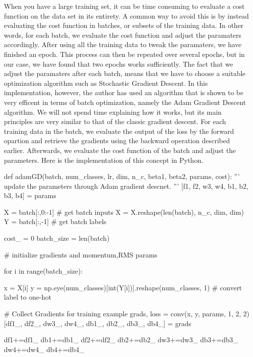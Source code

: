 \startsubsection[title=Batch Optimization]
When you have a large training set, it can be time consuming to evaluate a cost function on the data set in its entirety.
A common way to avoid this is by instead evaluating the cost function in batches, or subsets of the training data.
In other words, for each batch, we evaluate the cost function and adjust the paramaters accordingly. 
After using all the training data to tweak the paramaters, we have finished an epoch.
This process can then be repeated over several epochs, but in our case, we have found that two epochs works sufficiently.
The fact that we adjust the paramaters after each batch, means that we have to choose a suitable optimization algorithm such as Stochastic Gradient Descent.
In this implementation, however, the author has used an algorithm that is shown to be very efficent in terms of batch optimization, namely the Adam Gradient Descent algorithm.
We will not spend time explaining how it works, but its main principles are very similar to that of the classic gradient descent.
For each training data in the batch, we evaluate the output of the loss by the forward opartion and retrieve the gradients using the backward operation described earlier. 
Afterwards, we evaluate the cost function of the batch and adjust the parameters.
Here is the implementation of this concept in Python.

\starttyping
def adamGD(batch, num_classes, lr, dim, n_c, beta1, beta2, params, cost):
    '''
    update the parameters through Adam gradient descnet.
    '''
    [f1, f2, w3, w4, b1, b2, b3, b4] = params
    
    X = batch[:,0:-1] # get batch inputs
    X = X.reshape(len(batch), n_c, dim, dim)
    Y = batch[:,-1] # get batch labels
    
    cost_ = 0
    batch_size = len(batch)
    
    # initialize gradients and momentum,RMS params

    for i in range(batch_size):
        
        x = X[i]
        y = np.eye(num_classes)[int(Y[i])].reshape(num_classes, 1) # convert label to one-hot
        
        # Collect Gradients for training example
        grads, loss = conv(x, y, params, 1, 2, 2)
        [df1_, df2_, dw3_, dw4_, db1_, db2_, db3_, db4_] = grads
        
        df1+=df1_
        db1+=db1_
        df2+=df2_
        db2+=db2_
        dw3+=dw3_
        db3+=db3_
        dw4+=dw4_
        db4+=db4_

